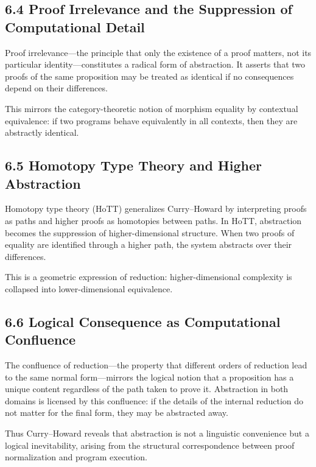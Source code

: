 \documentclass[12pt,letterpaper]{article}
\theoremstyle{remark}
\begin{document}
\subsection{6.4 Proof Irrelevance and the Suppression of Computational Detail}

Proof irrelevance—the principle that only the existence of a proof matters, not its particular identity—constitutes a radical form of abstraction. It asserts that two proofs of the same proposition may be treated as identical if no consequences depend on their differences.

This mirrors the category-theoretic notion of morphism equality by contextual equivalence: if two programs behave equivalently in all contexts, then they are abstractly identical.

\subsection{6.5 Homotopy Type Theory and Higher Abstraction}

Homotopy type theory (HoTT) generalizes Curry--Howard by interpreting proofs as paths and higher proofs as homotopies between paths. In HoTT, abstraction becomes the suppression of higher-dimensional structure. When two proofs of equality are identified through a higher path, the system abstracts over their differences.

This is a geometric expression of reduction: higher-dimensional complexity is collapsed into lower-dimensional equivalence.

\subsection{6.6 Logical Consequence as Computational Confluence}

The confluence of reduction—the property that different orders of reduction lead to the same normal form—mirrors the logical notion that a proposition has a unique content regardless of the path taken to prove it. Abstraction in both domains is licensed by this confluence: if the details of the internal reduction do not matter for the final form, they may be abstracted away.

Thus Curry--Howard reveals that abstraction is not a linguistic convenience but a logical inevitability, arising from the structural correspondence between proof normalization and program execution.

\newpage

\end{document}
